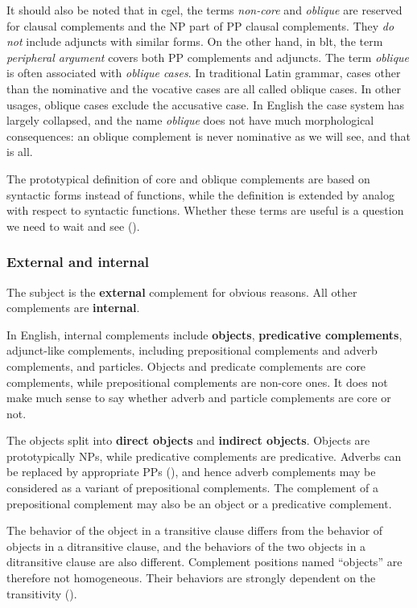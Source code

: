 \documentclass{article}
\newcommand*{\concept}[1]{\textbf{#1}}
\newcommand*{\term}[1]{\emph{#1}}
\begin{document}
It should also be noted that in \ac{cgel}, the terms \term{non-core} and \term{oblique} 
are reserved for clausal complements and the NP part of PP clausal complements.
They \emph{do not} include adjuncts with similar forms.
On the other hand, in \ac{blt}, the term \term{peripheral argument} covers both PP complements and adjuncts.
The term \term{oblique} is often associated with \term{oblique cases}.
In traditional Latin grammar, 
cases other than the nominative and the vocative cases are all called oblique cases.
In other usages, oblique cases exclude the accusative case.
In English the case system has largely collapsed,
and the name \term{oblique} does not have much morphological consequences:
an oblique complement is never nominative as we will see, and that is all.

The prototypical definition of core and oblique complements 
are based on syntactic forms instead of functions,
while the definition is extended by analog with respect to syntactic functions.
Whether these terms are useful is a question we need to wait and see ().

\subsubsection{External and internal}\label{sec:external-and-internal}

The subject is the \concept{external} complement for obvious reasons.
All other complements are \concept{internal}.

In English, internal complements include \concept{objects}, \concept{predicative complements},
adjunct-like complements, including prepositional complements and adverb complements,
and particles.
Objects and predicate complements are core complements,
while prepositional complements are non-core ones.
It does not make much sense to say whether adverb and particle complements are core or not.

The objects split into \concept{direct objects} and \concept{indirect objects}.
Objects are prototypically NPs, 
while predicative complements are predicative.
Adverbs can be replaced by appropriate PPs (), %
and hence adverb complements may be considered as a variant of prepositional complements.
The complement of a prepositional complement may also be an object or a predicative complement.

The behavior of the object in a transitive clause differs from 
the behavior of objects in a ditransitive clause,
and the behaviors of the two objects in a ditransitive clause are also different.
Complement positions named ``objects'' are therefore not homogeneous.
Their behaviors are strongly dependent on the transitivity ().
\end{document}
